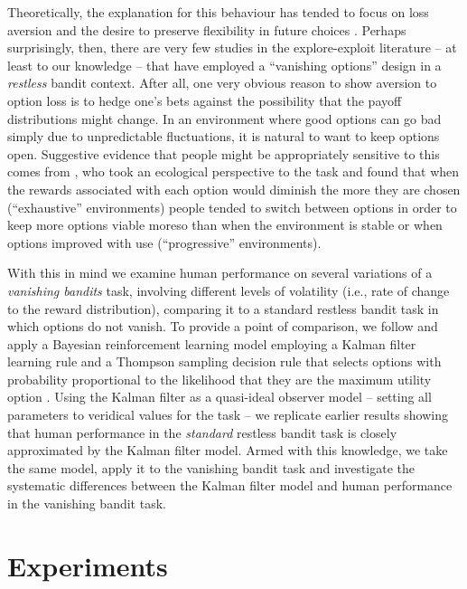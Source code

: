 \documentclass[a4paper,doc,natbib]{apa6}
\begin{document}
Theoretically, the explanation for this behaviour has tended to focus on loss aversion  \citep{shin2004keeping} and the desire to preserve flexibility in future choices \citep{neth2014foraging}. Perhaps surprisingly, then, there are very few studies in the explore-exploit literature -- at least to our knowledge -- that have employed a ``vanishing options'' design in a {\it restless} bandit context.
After all, one very obvious reason to show aversion to option loss is to hedge one's bets against the possibility that the payoff distributions might change. In an environment where good options can go bad simply due to unpredictable fluctuations, it is natural to want to keep options open. Suggestive evidence that people might be appropriately sensitive to this comes from \cite{neth2014foraging}, who took an ecological perspective to the \cite{shin2004keeping} task and found that when the rewards associated with each option would diminish the more they are chosen (``exhaustive'' environments) people tended to switch between options in order to keep more options viable moreso than when the environment is stable or when options improved with use (``progressive'' environments).

With this in mind we examine human performance on several variations of a {\it vanishing bandits} task, involving different levels of volatility (i.e., rate of change to the reward distribution), comparing it to a standard restless bandit task in which options do not vanish. To provide a point of comparison, we follow \cite{speekenbrink2015uncertainty} and apply a Bayesian reinforcement learning model employing a  Kalman filter learning rule \citep{kalman1960new,daw2006cortical} and a Thompson sampling decision rule that selects options with probability proportional to the likelihood that they are the maximum utility option \citep{thompson1933likelihood,chapelle2011empirical}. Using the Kalman filter as a quasi-ideal observer model -- setting all parameters to veridical values for the task -- we replicate earlier results showing that human performance in the {\it standard} restless bandit task is closely approximated by the Kalman filter model. Armed with this knowledge, we take the same model, apply it to the vanishing bandit task and investigate the systematic differences between the Kalman filter model and human performance in the vanishing bandit task.

\section{Experiments}
\end{document}
